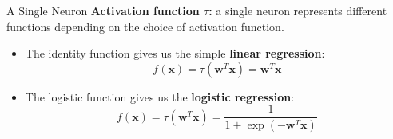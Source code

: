 \documentclass[11pt,compress,t,notes=noshow, xcolor=table]{beamer}
\begin{document}
\begin{vbframe}{A Single Neuron}
\textbf{Activation function $\tau$:} a single neuron %
 represents different functions %
 depending on the choice of activation function.
\vspace{.5cm}
\begin{itemize}
\item The identity function gives us the simple \textbf{linear regression}:
$$f(\mathbf{x}) = \tau(\mathbf{w}^T \mathbf{x}) = \mathbf{w}^T \mathbf{x}$$
\item The logistic function gives us the \textbf{logistic regression}:
$$f(\mathbf{x}) = \tau(\mathbf{w}^T \mathbf{x}) = \frac{1}{1 + \exp(-\mathbf{w}^T \mathbf{x})}$$
\end{itemize}
\end{vbframe}
\end{document}
